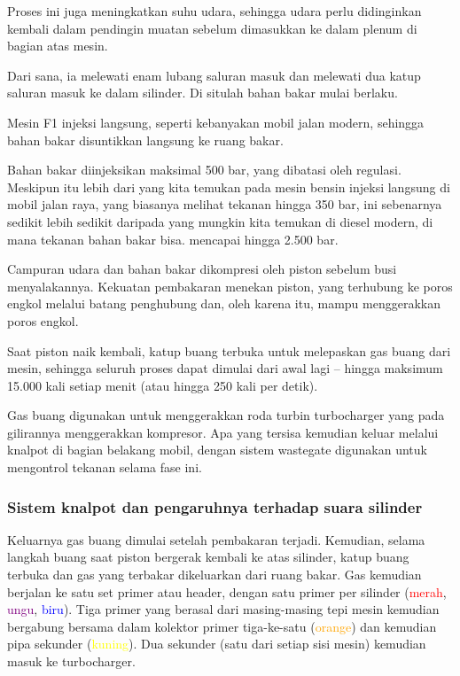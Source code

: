 Proses ini juga meningkatkan suhu udara, sehingga udara perlu didinginkan kembali dalam pendingin muatan sebelum dimasukkan ke dalam plenum di bagian atas mesin. \newline

Dari sana, ia melewati enam lubang saluran masuk dan melewati dua katup saluran masuk ke dalam silinder. Di situlah bahan bakar mulai berlaku. \newline

Mesin F1 injeksi langsung, seperti kebanyakan mobil jalan modern, sehingga bahan bakar disuntikkan langsung ke ruang bakar. \newline

Bahan bakar diinjeksikan maksimal 500 bar, yang dibatasi oleh regulasi. Meskipun itu lebih dari yang kita temukan pada mesin bensin injeksi langsung di mobil jalan raya, yang biasanya melihat tekanan hingga 350 bar, ini sebenarnya sedikit lebih sedikit daripada yang mungkin kita temukan di diesel modern, di mana tekanan bahan bakar bisa. mencapai hingga 2.500 bar. \newline

Campuran udara dan bahan bakar dikompresi oleh piston sebelum busi menyalakannya. Kekuatan pembakaran menekan piston, yang terhubung ke poros engkol melalui batang penghubung dan, oleh karena itu, mampu menggerakkan poros engkol. \newline

Saat piston naik kembali, katup buang terbuka untuk melepaskan gas buang dari mesin, sehingga seluruh proses dapat dimulai dari awal lagi – hingga maksimum 15.000 kali setiap menit (atau hingga 250 kali per detik). \newline

Gas buang digunakan untuk menggerakkan roda turbin turbocharger yang pada gilirannya menggerakkan kompresor. Apa yang tersisa kemudian keluar melalui knalpot di bagian belakang mobil, dengan sistem wastegate digunakan untuk mengontrol tekanan selama fase ini.

\subsubsection{Sistem knalpot dan pengaruhnya terhadap suara silinder}

Keluarnya gas buang dimulai setelah pembakaran terjadi. Kemudian, selama langkah buang saat piston bergerak kembali ke atas silinder, katup buang terbuka dan gas yang terbakar dikeluarkan dari ruang bakar. Gas kemudian berjalan ke satu set primer atau header, dengan satu primer per silinder (\textcolor{red}{merah}, \textcolor{purple}{ungu}, \textcolor{blue}{biru}). Tiga primer yang berasal dari masing-masing tepi mesin kemudian bergabung bersama dalam kolektor primer tiga-ke-satu (\textcolor{orange}{orange}) dan kemudian pipa sekunder (\textcolor{yellow}{kuning}). Dua sekunder (satu dari setiap sisi mesin) kemudian masuk ke turbocharger.

